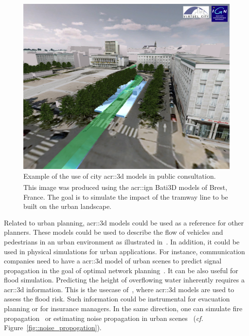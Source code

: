             \begin{figure}[htpb]
                \centering
                \includegraphics[width=\textwidth]{images/introduction/3d_model_applications/brest_tramway}
                \caption[
                    Example of the use of city \acrshort*{acr::3d} models in public consultation.
                ]{
                    \label{fig::public_consultation}
                    Example of the use of city \gls{acr::3d} models in public consultation.
                    This image was produced using the \gls{acr::ign} Bati3D\textsuperscript{\textregistered} models of Brest, France.
                    The goal is to simulate the impact of the tramway line to be built on the urban landscape.
                }
            \end{figure}

            Related to urban planning, \gls{acr::3d} models could be used as a reference for other planners.
            These models could be used to describe the flow of vehicles and pedestrians in an urban environment as illustrated in~\textcite{vanhoey2017varcity}.
            In addition, it could be used in physical simulations for urban applications.
            For instance, communication companies need to have a \gls{acr::3d} model of urban scenes to predict signal propagation in the goal of optimal network planning~\parencite{yun2007radio}.
            It can be also useful for flood simulation.
            Predicting the height of overflowing water inherently requires a \gls{acr::3d} information.
            This is the usecase of~\textcite{varduhn2015multi}, where \gls{acr::3d} models are used to assess the flood risk.
            Such information could be instrumental for evacuation planning or for insurance managers.
            In the same direction, one can simulate fire propagation~\parencite{dimitropoulos2010fire} or estimating noise propagation in urban scenes~\parencite{stoter20083d} (\textit{cf.} Figure~\ref{fig::noise_propogation}).

